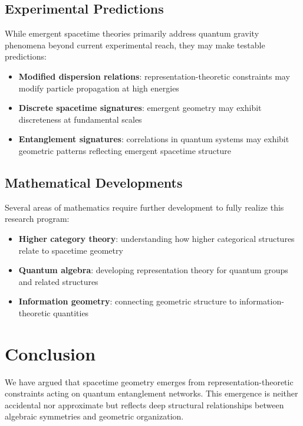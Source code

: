 \documentclass[12pt]{article}
\begin{document}
\subsection{Experimental Predictions}

While emergent spacetime theories primarily address quantum gravity phenomena beyond current experimental reach, they may make testable predictions:

\begin{itemize}
\item \textbf{Modified dispersion relations}: representation-theoretic constraints may modify particle propagation at high energies
\item \textbf{Discrete spacetime signatures}: emergent geometry may exhibit discreteness at fundamental scales
\item \textbf{Entanglement signatures}: correlations in quantum systems may exhibit geometric patterns reflecting emergent spacetime structure
\end{itemize}

\subsection{Mathematical Developments}

Several areas of mathematics require further development to fully realize this research program:

\begin{itemize}
\item \textbf{Higher category theory}: understanding how higher categorical structures relate to spacetime geometry
\item \textbf{Quantum algebra}: developing representation theory for quantum groups and related structures
\item \textbf{Information geometry}: connecting geometric structure to information-theoretic quantities
\end{itemize}

\section{Conclusion}

We have argued that spacetime geometry emerges from representation-theoretic constraints acting on quantum entanglement networks. This emergence is neither accidental nor approximate but reflects deep structural relationships between algebraic symmetries and geometric organization.
\end{document}
